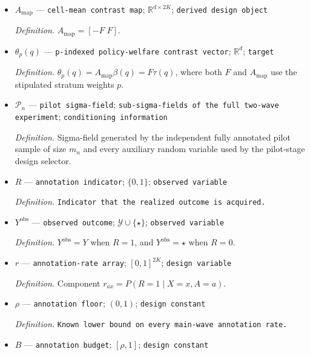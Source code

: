 \documentclass{article}
\begin{document}
\begin{itemize}
  \par\smallskip\noindent\emph{Definition.} \texttt{Coordinate for treatment-\allowbreak{}effect directions that preserve every policy contrast.}
  \item \(A_{\mathrm{map}}\) --- \texttt{cell-\allowbreak{}mean contrast map}; \(\mathbb R^{d\times 2K}\); \texttt{derived design object}
  \par\smallskip\noindent\emph{Definition.} \(A_{\mathrm{map}}=[-F\;F]\).
  \item \(\theta_p(q)\) --- \texttt{p-\allowbreak{}indexed policy-\allowbreak{}welfare contrast vector}; \(\mathbb R^d\); \texttt{target}
  \par\smallskip\noindent\emph{Definition.} \(\theta_p(q)=A_{\mathrm{map}}\beta(q)=F\tau(q)\), where both \(F\) and \(A_{\mathrm{map}}\) use the stipulated stratum weights \(p\).
  \item \(\mathscr P_n\) --- \texttt{pilot sigma-\allowbreak{}field}; \texttt{sub-\allowbreak{}sigma-\allowbreak{}fields of the full two-\allowbreak{}wave experiment}; \texttt{conditioning information}
  \par\smallskip\noindent\emph{Definition.} Sigma-field generated by the independent fully annotated pilot sample of size \(m_n\) and every auxiliary random variable used by the pilot-stage design selector.
  \item \(R\) --- \texttt{annotation indicator}; \(\{0,1\}\); \texttt{observed variable}
  \par\smallskip\noindent\emph{Definition.} \texttt{Indicator that the realized outcome is acquired.}
  \item \(Y^{\mathrm{obs}}\) --- \texttt{observed outcome}; \(\mathcal Y\cup\{\star\}\); \texttt{observed variable}
  \par\smallskip\noindent\emph{Definition.} \(Y^{\mathrm{obs}}=Y\) when \(R=1\), and \(Y^{\mathrm{obs}}=\star\) when \(R=0\).
  \item \(r\) --- \texttt{annotation-\allowbreak{}rate array}; \([0,1]^{2K}\); \texttt{design variable}
  \par\smallskip\noindent\emph{Definition.} Component \(r_{ax}=P(R=1\mid X=x,A=a)\).
  \item \(\rho\) --- \texttt{annotation floor}; \((0,1)\); \texttt{design constant}
  \par\smallskip\noindent\emph{Definition.} \texttt{Known lower bound on every main-\allowbreak{}wave annotation rate.}
  \item \(B\) --- \texttt{annotation budget}; \([\rho,1]\); \texttt{design constant}

\end{itemize}
\end{document}
